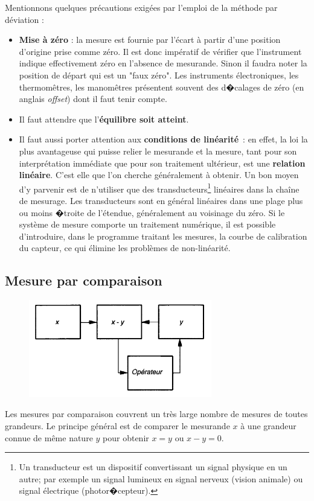 Mentionnons quelques précautions exigées par l'emploi de la méthode par déviation :
\begin{itemize}\itemsep2pt
\renewcommand{\labelitemi}{$\bullet$}
\item\textbf{Mise à zéro} : la mesure est fournie par l'écart à partir d'une position d'origine prise comme zéro. Il est donc impératif de vérifier que l'instrument indique effectivement zéro en l'absence de mesurande. Sinon il faudra noter la position de départ qui est un "faux zéro". Les instruments électroniques, les thermomêtres, les manomêtres présentent souvent des d�calages de zéro (en anglais \textit{offset}) dont il faut tenir compte.
\item Il faut attendre que l'\textbf{équilibre soit atteint}.
\item Il faut aussi porter attention aux \textbf{conditions de linéarité}~: en effet, la loi la plus avantageuse qui puisse relier le mesurande et la mesure, tant pour son interprétation immédiate que pour son traitement ultérieur, est une \textbf{relation linéaire}. C'est elle que l'on cherche généralement à obtenir. Un bon moyen d'y parvenir est de n'utiliser que des transducteurs\footnote{Un transducteur est un dispositif convertissant un signal physique en un autre; par exemple un signal lumineux en signal nerveux (vision animale) ou signal électrique (photor�cepteur).} linéaires dans la chaîne de mesurage. Les transducteurs sont en général linéaires dans une plage plus ou moins �troite de l'étendue, généralement au voisinage du zéro. Si le système de mesure comporte un traitement numérique, il est possible d'introduire, dans le programme traitant les mesures, la courbe de calibration du capteur, ce qui élimine les problèmes de non-linéarité.
\end{itemize}

\newpage

\subsection{Mesure par comparaison}

\begin{figure}
   \centering
   \includegraphics[width=8cm]{assets/figures/asscomp.pdf}
   \label{fig:asscomp}
\end{figure}
Les mesures par comparaison couvrent un très large nombre de mesures de toutes grandeurs. Le principe général est de comparer le mesurande $x$ à une grandeur connue de même nature $y$ pour obtenir $x=y$ ou $x-y=0$.

